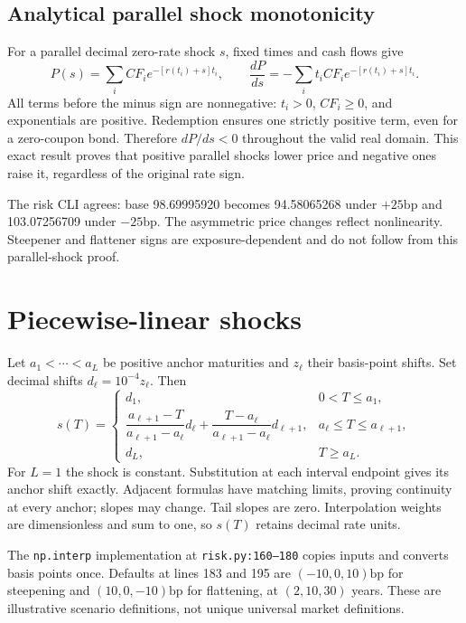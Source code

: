 \documentclass[12pt,a4paper]{article}
\newcommand{\bp}{\mathrm{bp}}
\begin{document}
\subsection{Analytical parallel shock monotonicity}
For a parallel decimal zero-rate shock $s$, fixed times and cash flows give
\begin{equation}
 P(s)=\sum_i CF_i e^{-[r(t_i)+s]t_i},\qquad
 \frac{dP}{ds}=-\sum_i t_iCF_i e^{-[r(t_i)+s]t_i}.
\end{equation}
All terms before the minus sign are nonnegative: $t_i>0$, $CF_i\geq0$,
and exponentials are positive. Redemption ensures one strictly positive
term, even for a zero-coupon bond. Therefore $dP/ds<0$ throughout the
valid real domain. This exact result proves that positive parallel shocks
lower price and negative ones raise it, regardless of the original rate sign.

The risk CLI agrees: base 98.69995920 becomes 94.58065268 under
$+25\bp$ and 103.07256709 under $-25\bp$.
The asymmetric price changes reflect nonlinearity.
Steepener and flattener signs are exposure-dependent and do not follow
from this parallel-shock proof.

\section{Piecewise-linear shocks}
Let $a_1<\cdots<a_L$ be positive anchor maturities and $z_\ell$ their
basis-point shifts. Set decimal shifts $d_\ell=10^{-4}z_\ell$. Then
\begin{equation}
 s(T)=
 \begin{cases}
 d_1,&0<T\leq a_1,\\
 \dfrac{a_{\ell+1}-T}{a_{\ell+1}-a_\ell}d_\ell+
 \dfrac{T-a_\ell}{a_{\ell+1}-a_\ell}d_{\ell+1},
       &a_\ell\leq T\leq a_{\ell+1},\\
 d_L,&T\geq a_L.
 \end{cases}
\end{equation}
For $L=1$ the shock is constant. Substitution at each interval endpoint
gives its anchor shift exactly. Adjacent formulas have matching limits,
proving continuity at every anchor; slopes may change. Tail slopes are
zero. Interpolation weights are dimensionless and sum to one, so $s(T)$
retains decimal rate units.

The \texttt{np.interp} implementation at \texttt{risk.py:160--180}
copies inputs and converts basis points once.
Defaults at lines 183 and 195 are $(-10,0,10)\bp$ for steepening and
$(10,0,-10)\bp$ for flattening, at $(2,10,30)$ years. These are illustrative
scenario definitions, not unique universal market definitions.
\end{document}
